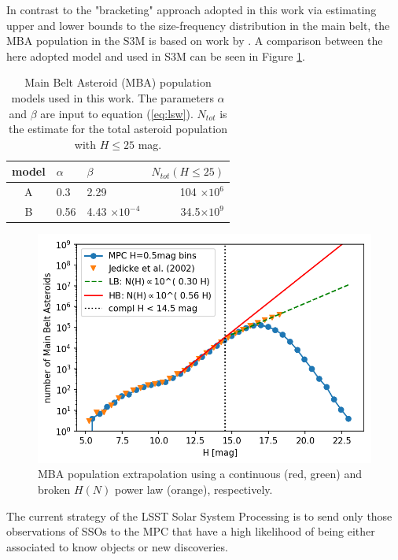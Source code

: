 In contrast to the "bracketing" approach adopted in this work via estimating upper and lower bounds to the size-frequency distribution in the main belt, the \gls{MBA} population in the S3M is based on work by \citet{jedicke2002}. A comparison between the here adopted model and \citet{jedicke2002} used in S3M can be seen in Figure \ref{fig:mba_pop}.
\begin{table}[t!]
\begin{center}
\begin{tabular}{cllr}
\hline
model & $\alpha$ & $\beta$ & $N_{tot}(H \le 25)$ \\
\hline
A & 0.3 &  2.29 & 104 $\times 10^{6}$ \\
B & 0.56 &4.43 $\times 10^{-4}$ & 34.5$\times 10^{9}$\\
\hline
\end{tabular}
\end{center}
\caption{Main Belt Asteroid (\gls{MBA}) population models used in this work. The parameters $\alpha$ and $\beta$ are input to equation (\ref{eq:lsw}). $N_{tot}$ is the estimate for the total asteroid population with $H\le 25$ mag. }
\label{tab:mbapop}
\end{table}
\begin{figure}[b!]
\begin{center}
\includegraphics[scale=.8]{figs/mpc_population_4.png}
\end{center}
\caption{MBA population extrapolation using a continuous (red, green) and broken $H(N)$ power law (orange), respectively.}
\label{fig:mba_pop}       %
\end{figure} 
%
The current strategy of the \gls{LSST} Solar System Processing is to send only those observations of SSOs to the \gls{MPC} that have a high likelihood of being either associated to know objects or new discoveries. 

